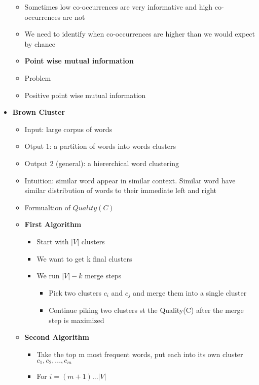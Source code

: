 \begin{itemize}
\begin{itemize}
        \item Sometimes low co-occurrences are very informative and high co-occurrences are not
        \item We need to identify when co-occurrences are higher than we would expect by chance
        \item \textbf{Point wise mutual information}
        \item Problem 
        \item Positive point wise mutual information
    \end{itemize}
    \item \textbf{Brown Cluster}
    \begin{itemize}
        \item Input: large corpus of words
        \item Otput 1: a partition of words into words clusters
        \item Output 2 (general): a hiererchical word clustering
        \item Intuition: similar word appear in similar context. Similar word have similar distribution of words to their immediate left and right
        \item Formualtion of \(Quality(C)\)
        \item \textbf{First Algorithm}
        \begin{itemize}
            \item Start with \(|V|\) clusters 
            \item We want to get k final clusters
            \item We run \(|V| - k\) merge steps
            \begin{itemize}
                \item Pick two clusters \(c_i\) and \(c_j\) and merge them into a single cluster
                \item Continue piking two clusters st the Quality(C) after the merge step is maximized 
            \end{itemize}
        \end{itemize}
        \item \textbf{Second Algorithm}
        \begin{itemize}
            \item Take the top m most frequent words, put each into its own cluster \(c_1, c_2, ..., c_m\)
            \item For \(i = (m  + 1) ... |V|\)
            \begin{itemize}

\end{itemize}
\end{itemize}
\end{itemize}
\end{itemize}
